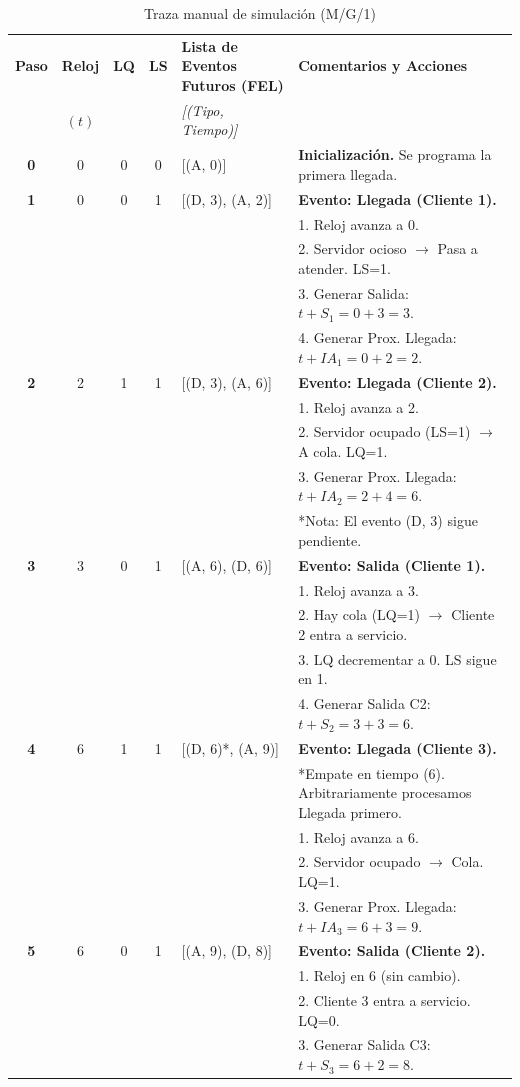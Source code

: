 \documentclass[11pt, letterpaper]{article}
\begin{document}
\begin{table}[H]
\centering
\small
\begin{tabular}{|c|c|c|c|l|l|}
\hline
\textbf{Paso} & \textbf{Reloj} & \textbf{LQ} & \textbf{LS} & \textbf{Lista de Eventos Futuros (FEL)} & \textbf{Comentarios y Acciones} \\ 
 & $(t)$ & & & \textit{[(Tipo, Tiempo)]} & \\ \hline
\hline
\textbf{0} & 0 & 0 & 0 & [(A, 0)] & \textbf{Inicialización.} Se programa la primera llegada. \\ \hline
\textbf{1} & 0 & 0 & 1 & [(D, 3), (A, 2)] & \textbf{Evento: Llegada (Cliente 1).} \\
 & & & & & 1. Reloj avanza a 0. \\
 & & & & & 2. Servidor ocioso $\to$ Pasa a atender. LS=1. \\
 & & & & & 3. Generar Salida: $t + S_1 = 0 + 3 = 3$. \\
 & & & & & 4. Generar Prox. Llegada: $t + IA_1 = 0 + 2 = 2$. \\ \hline
\textbf{2} & 2 & 1 & 1 & [(D, 3), (A, 6)] & \textbf{Evento: Llegada (Cliente 2).} \\
 & & & & & 1. Reloj avanza a 2. \\
 & & & & & 2. Servidor ocupado (LS=1) $\to$ A cola. LQ=1. \\
 & & & & & 3. Generar Prox. Llegada: $t + IA_2 = 2 + 4 = 6$. \\
 & & & & & *Nota: El evento (D, 3) sigue pendiente. \\ \hline
\textbf{3} & 3 & 0 & 1 & [(A, 6), (D, 6)] & \textbf{Evento: Salida (Cliente 1).} \\
 & & & & & 1. Reloj avanza a 3. \\
 & & & & & 2. Hay cola (LQ=1) $\to$ Cliente 2 entra a servicio. \\
 & & & & & 3. LQ decrementar a 0. LS sigue en 1. \\
 & & & & & 4. Generar Salida C2: $t + S_2 = 3 + 3 = 6$. \\ \hline
\textbf{4} & 6 & 1 & 1 & [(D, 6)*, (A, 9)] & \textbf{Evento: Llegada (Cliente 3).} \\
 & & & & & *Empate en tiempo (6). Arbitrariamente procesamos Llegada primero. \\
 & & & & & 1. Reloj avanza a 6. \\
 & & & & & 2. Servidor ocupado $\to$ Cola. LQ=1. \\
 & & & & & 3. Generar Prox. Llegada: $t + IA_3 = 6 + 3 = 9$. \\ \hline
\textbf{5} & 6 & 0 & 1 & [(A, 9), (D, 8)] & \textbf{Evento: Salida (Cliente 2).} \\
 & & & & & 1. Reloj en 6 (sin cambio). \\
 & & & & & 2. Cliente 3 entra a servicio. LQ=0. \\
 & & & & & 3. Generar Salida C3: $t + S_3 = 6 + 2 = 8$. \\ \hline
\end{tabular}
\caption{Traza manual de simulación (M/G/1)}
\end{table}
\end{document}
